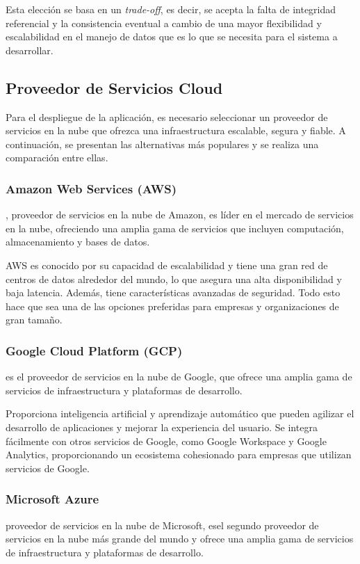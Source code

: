 Esta elección se basa en un \textit{trade-off}, es decir, se acepta la falta de integridad referencial y la consistencia eventual a cambio de una mayor flexibilidad y escalabilidad en el manejo de datos que es lo que se necesita para el sistema a desarrollar.


\subsection{Proveedor de Servicios Cloud}
Para el despliegue de la aplicación, es necesario seleccionar un proveedor de servicios en la nube que ofrezca una infraestructura escalable, segura y fiable. 
A continuación, se presentan las alternativas más populares y se realiza una comparación entre ellas.


\subsubsection{Amazon Web Services (AWS)}
, proveedor de servicios en la nube de Amazon, es líder en el mercado de servicios en la nube, ofreciendo una amplia gama de servicios 
que incluyen computación, almacenamiento y bases de datos. 

AWS es conocido por su capacidad de escalabilidad y tiene una gran red de centros de datos alrededor del mundo, 
lo que asegura una alta disponibilidad y baja latencia.  
Además, tiene características avanzadas de seguridad.
Todo esto hace que sea una de las opciones preferidas para empresas y organizaciones de gran tamaño.

\subsubsection{Google Cloud Platform (GCP)}
  es el proveedor de servicios en la nube de Google, que ofrece una amplia gama de servicios de infraestructura y plataformas de desarrollo.

Proporciona inteligencia artificial y aprendizaje automático que pueden agilizar el desarrollo de aplicaciones y mejorar la experiencia del usuario.
Se integra fácilmente con otros servicios de Google, como Google Workspace y Google Analytics, proporcionando un ecosistema cohesionado para empresas que utilizan servicios de Google.


\subsubsection{Microsoft Azure}
 proveedor de servicios en la nube de Microsoft, esel segundo proveedor de servicios en la nube más grande del mundo 
y ofrece una amplia gama de servicios de infraestructura y plataformas de desarrollo.

